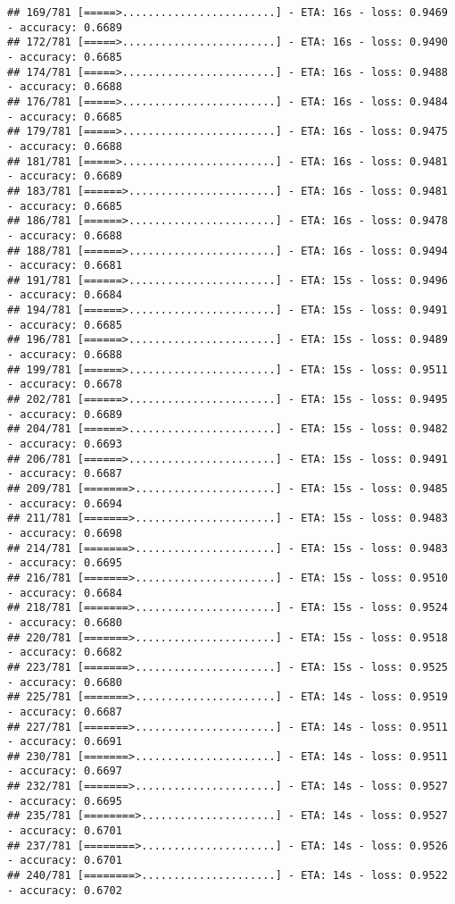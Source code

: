 \documentclass[
]{article}
\begin{document}
\begin{verbatim}
## 169/781 [=====>........................] - ETA: 16s - loss: 0.9469 - accuracy: 0.6689
## 172/781 [=====>........................] - ETA: 16s - loss: 0.9490 - accuracy: 0.6685
## 174/781 [=====>........................] - ETA: 16s - loss: 0.9488 - accuracy: 0.6688
## 176/781 [=====>........................] - ETA: 16s - loss: 0.9484 - accuracy: 0.6685
## 179/781 [=====>........................] - ETA: 16s - loss: 0.9475 - accuracy: 0.6688
## 181/781 [=====>........................] - ETA: 16s - loss: 0.9481 - accuracy: 0.6689
## 183/781 [======>.......................] - ETA: 16s - loss: 0.9481 - accuracy: 0.6685
## 186/781 [======>.......................] - ETA: 16s - loss: 0.9478 - accuracy: 0.6688
## 188/781 [======>.......................] - ETA: 16s - loss: 0.9494 - accuracy: 0.6681
## 191/781 [======>.......................] - ETA: 15s - loss: 0.9496 - accuracy: 0.6684
## 194/781 [======>.......................] - ETA: 15s - loss: 0.9491 - accuracy: 0.6685
## 196/781 [======>.......................] - ETA: 15s - loss: 0.9489 - accuracy: 0.6688
## 199/781 [======>.......................] - ETA: 15s - loss: 0.9511 - accuracy: 0.6678
## 202/781 [======>.......................] - ETA: 15s - loss: 0.9495 - accuracy: 0.6689
## 204/781 [======>.......................] - ETA: 15s - loss: 0.9482 - accuracy: 0.6693
## 206/781 [======>.......................] - ETA: 15s - loss: 0.9491 - accuracy: 0.6687
## 209/781 [=======>......................] - ETA: 15s - loss: 0.9485 - accuracy: 0.6694
## 211/781 [=======>......................] - ETA: 15s - loss: 0.9483 - accuracy: 0.6698
## 214/781 [=======>......................] - ETA: 15s - loss: 0.9483 - accuracy: 0.6695
## 216/781 [=======>......................] - ETA: 15s - loss: 0.9510 - accuracy: 0.6684
## 218/781 [=======>......................] - ETA: 15s - loss: 0.9524 - accuracy: 0.6680
## 220/781 [=======>......................] - ETA: 15s - loss: 0.9518 - accuracy: 0.6682
## 223/781 [=======>......................] - ETA: 15s - loss: 0.9525 - accuracy: 0.6680
## 225/781 [=======>......................] - ETA: 14s - loss: 0.9519 - accuracy: 0.6687
## 227/781 [=======>......................] - ETA: 14s - loss: 0.9511 - accuracy: 0.6691
## 230/781 [=======>......................] - ETA: 14s - loss: 0.9511 - accuracy: 0.6697
## 232/781 [=======>......................] - ETA: 14s - loss: 0.9527 - accuracy: 0.6695
## 235/781 [========>.....................] - ETA: 14s - loss: 0.9527 - accuracy: 0.6701
## 237/781 [========>.....................] - ETA: 14s - loss: 0.9526 - accuracy: 0.6701
## 240/781 [========>.....................] - ETA: 14s - loss: 0.9522 - accuracy: 0.6702

\end{verbatim}
\end{document}
